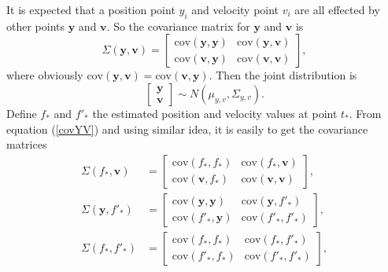 It is expected that a position point $y_i$ and velocity point $v_i$ are all effected by other points $\mathbf{y}$ and $\mathbf{v}$. So the covariance matrix for $\mathbf{y}$ and $\mathbf{v}$ is
\begin{equation}\label{covYV}
\Sigma(\mathbf{y},\mathbf{v}) = 
\left[
\begin{matrix}
\text{cov}(\mathbf{y},\mathbf{y}) & \text{cov}(\mathbf{y},\mathbf{v}) \\
\text{cov}(\mathbf{v},\mathbf{y}) & \text{cov}(\mathbf{v},\mathbf{v}) 
\end{matrix}\right],
\end{equation}
where obviously $\text{cov}(\mathbf{y},\mathbf{v}) =\text{cov}(\mathbf{v},\mathbf{y})$. Then the joint distribution  is 
\begin{equation}
\left[
\begin{matrix}
\mathbf{y}\\
\mathbf{v}
\end{matrix}
\right] \sim N(\mu_{y,v},\Sigma_{y,v}).
\end{equation}
Define $f_*$ and $f'_*$ the estimated position and velocity values at point $t_*$. From equation (\ref{covYV}) and using similar idea, it is easily to get the covariance matrices 
\begin{equation}
\begin{split}
\Sigma(f_*,\mathbf{v}) &= 
\left[
\begin{matrix}
\text{cov}(f_*,f_*) & \text{cov}(f_*,\mathbf{v}) \\
\text{cov}(\mathbf{v},f_*) & \text{cov}(\mathbf{v},\mathbf{v}) 
\end{matrix}\right],\\
\Sigma(\mathbf{y},f'_*) &= 
\left[
\begin{matrix}
\text{cov}(\mathbf{y},\mathbf{y}) & \text{cov}(\mathbf{y},f'_*) \\
\text{cov}(f'_*,\mathbf{y}) & \text{cov}(f'_*,f'_*) 
\end{matrix}\right],\\
\Sigma(f_*,f'_*) &= 
\left[
\begin{matrix}
\text{cov}(f_*,f_*) & \text{cov}(f_*,f'_*) \\
\text{cov}(f'_*,f_*) & \text{cov}(f'_*,f'_*) 
\end{matrix}\right],
\end{split}
\end{equation}

